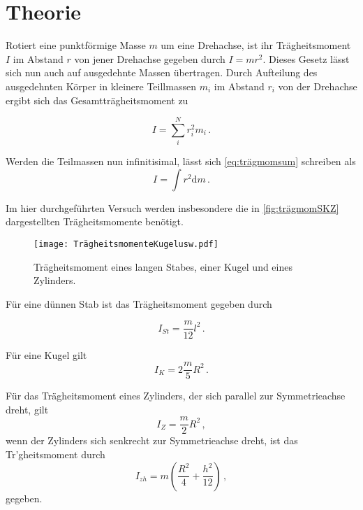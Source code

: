 \section{Theorie}
\label{sec:Theorie}
Rotiert eine punktförmige Masse $m$ um eine Drehachse, ist ihr Trägheitsmoment $I$ im Abstand $r$ von jener Drehachse gegeben durch $I = m r^2$.
Dieses Gesetz lässt sich nun auch auf ausgedehnte Massen übertragen. Durch Aufteilung des ausgedehnten Körper in kleinere Teillmassen $m_i$ im Abstand $r_i$ von der Drehachse ergibt sich
das Gesamtträgheitsmoment zu

\begin{equation}
    I = \sum_i^N r^2_i m_i\,.
    \label{eq:trägmomsum}
\end{equation}

Werden die Teilmassen nun infinitisimal, lässt sich \eqref{eq:trägmomsum} schreiben als
\begin{equation}
    I = \int r^2 \mathrm{d}m\,.
    \label{eq:trägmomint}
\end{equation}

Im hier durchgeführten Versuch werden insbesondere die in \autoref{fig:trägmomSKZ} dargestellten Trägheitsmomente benötigt.

\begin{figure}
    \centering
    \texttt{[image: TrägheitsmomenteKugelusw.pdf]}
    \caption{Trägheitsmoment eines langen Stabes, einer Kugel und eines Zylinders\cite{ap05}.}
    \label{fig:trägmomSKZ}
\end{figure}
Für eine dünnen Stab ist das Trägheitsmoment gegeben durch 

\begin{equation}
    I_{St} = \dfrac{m}{12} l^2 \,.
    \label{eq:trägdünstab}
\end{equation}

Für eine Kugel gilt
\begin{equation}
    I_{K} = 2\dfrac{m}{5} R^2 \,.
    \label{eq:trägKugel}
\end{equation}

Für das Trägheitsmoment eines Zylinders, der sich parallel zur Symmetrieachse dreht, gilt
\begin{equation}
    I_{Z} = \dfrac{m}{2} R^2 \,,
    \label{eq:trägZylinderparall}
\end{equation}
wenn der Zylinders sich senkrecht zur Symmetrieachse dreht, ist das Tr'gheitsmoment durch 
\begin{equation}
    I_{zh} = m \left(\dfrac{R^2}{4} + \dfrac{h^2}{12} \right) \,,
    \label{eq:trägZylindersenkrecht}
\end{equation}
gegeben. \\

